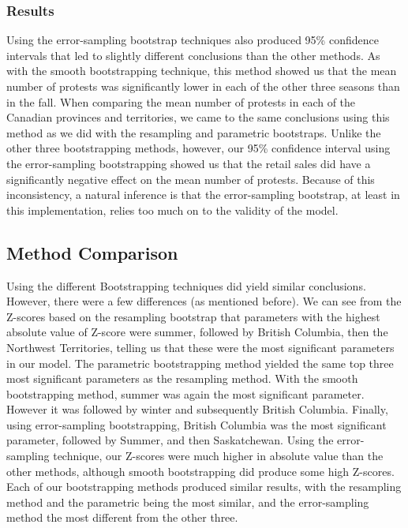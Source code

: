 \documentclass[12pt]{article}
\begin{document}
\subsubsection*{Results}
Using the error-sampling bootstrap techniques also produced 95\% confidence intervals that led to slightly different conclusions than the other methods. As with the smooth bootstrapping technique, this method showed us that the mean number of protests was significantly lower in each of the other three seasons than in the fall.
When comparing the mean number of protests in each of the Canadian provinces and territories, we came to the same conclusions using this method as we did with the resampling and parametric bootstraps.
Unlike the other three bootstrapping methods, however, our 95\% confidence interval using the error-sampling bootstrapping showed us that the retail sales did have a significantly negative effect on the mean number of protests. Because of this inconsistency, a natural inference is that the error-sampling bootstrap, at least in this implementation, relies too much on to the validity of the model.



\subsection{Method Comparison}
Using the different Bootstrapping techniques did yield similar conclusions. However, there were a few differences (as mentioned before). We can see from the Z-scores based on the resampling bootstrap that parameters with the highest absolute value of Z-score were summer, followed by British Columbia, then the Northwest Territories, telling us that these were the most significant parameters in our model. The parametric bootstrapping method yielded the same top three most significant parameters as the resampling method. With the smooth bootstrapping method, summer was again the most significant parameter. However it was followed by winter and subsequently British Columbia. Finally, using error-sampling bootstrapping, British Columbia was the most significant parameter, followed by Summer, and then Saskatchewan. Using the error-sampling technique, our Z-scores were much higher in absolute value than the other methods, although smooth bootstrapping did produce some high Z-scores.
Each of our bootstrapping methods produced similar results, with the resampling method and the parametric being the most similar, and the error-sampling method the most different from the other three.
\end{document}
